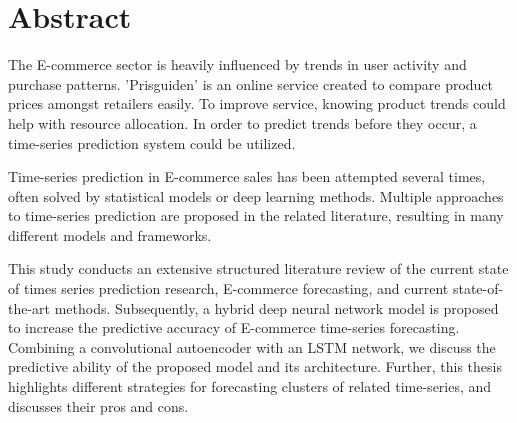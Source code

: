 \section*{Abstract}
\label{section:Abstract}

The E-commerce sector is heavily influenced by trends in user activity and purchase patterns.
'Prisguiden' is an online service created to compare product prices amongst retailers easily.
To improve service, knowing product trends could help with resource allocation.
In order to predict trends before they occur, a time-series prediction system could be utilized.

Time-series prediction in E-commerce sales has been attempted several times,
often solved by statistical models or deep learning methods.
Multiple approaches to time-series prediction are proposed in the related literature,
resulting in many different models and frameworks.

This study conducts an extensive structured literature review of the current state of times series prediction research, E-commerce forecasting,
and current state-of-the-art methods.
Subsequently, a hybrid deep neural network model is proposed to increase the predictive accuracy of E-commerce time-series forecasting.
Combining a convolutional autoencoder with an LSTM network, we discuss the predictive ability of the proposed model
and its architecture.
Further, this thesis highlights different strategies for forecasting clusters of related time-series, and discusses their pros and cons.
